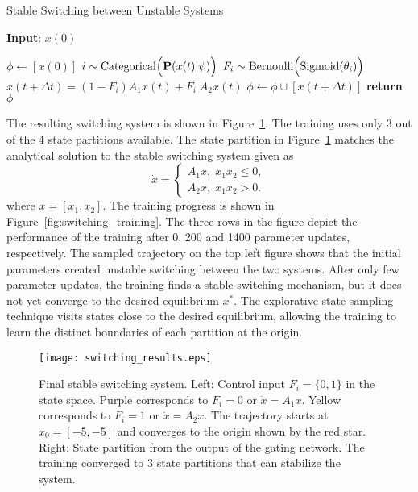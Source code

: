 \begin{algorithm}
      \caption{Stable Switching between Unstable Systems}
      \label{algo:switching_A1A2}
      \small
      \hspace*{\algorithmicindent} \textbf{Input}: $x(0)$
      \begin{algorithmic}[1]
        \State $\phi \leftarrow  [x(0)]$ 
              \State $i \sim \text{Categorical}\Bigl(\mathbf{P}(x(t)| \psi)\Bigr)$ 
              \State $F_i \sim \text{Bernoulli} \Bigl(\textrm{Sigmoid}(\theta_i) \Bigr)$      
              \State $x(t+\Delta t) = (1-F_i)A_1x(t) + F_i \; A_2x(t) $
              \State $\phi \leftarrow \phi \cup [x(t+\Delta t)]$
            \EndFor
          \State \textbf{return} $\phi$
      \end{algorithmic}
  \end{algorithm}
  
%
The resulting switching system is shown in Figure~\ref{fig:final_switching}.
%
The training uses only 3 out of the 4 state partitions available.
%
The state partition in Figure~\ref{fig:final_switching} matches the analytical
solution to the stable switching system given as~\cite{liberzon2003switching}
\begin{equation*}
    \dot{x} = \begin{cases}
        A_1x, \; x_1x_2 \leq 0, \\
        A_2x, \; x_1x_2 > 0.
    \end{cases}
\end{equation*}
\noindent where $x=[x_1, x_2]$.
%
The training progress is shown in Figure~\ref{fig:switching_training}.
%
The three rows in the figure depict the performance of the training after 0, 200
and 1400 parameter updates, respectively.
%
The sampled trajectory on the top left figure shows that the initial parameters
created unstable switching between the two systems.
%
After only few parameter updates, the training finds a stable switching
mechanism, but it does not yet converge to the desired equilibrium $x^*$.
%
The explorative state sampling technique visits states close to the desired
equilibrium, allowing the training to learn the distinct boundaries of each
partition at the origin. 
\begin{figure}[H]
    \centering
    \texttt{[image: switching\_results.eps]}
    \caption{Final stable switching system. Left: Control input $F_i=\{0, 1\}$ in
    the state space. Purple corresponds to $F_i=0$ or $\dot{x} = A_1x$. Yellow
    corresponds to $F_i=1$ or $\dot{x} = A_2x$. The trajectory starts at $x_0=[-5,
    -5]$ and converges to the origin shown by the red star. Right: State
    partition from the output of the gating network. The training converged to 3
    state partitions that can stabilize the system.}
    \label{fig:final_switching}
\end{figure}


